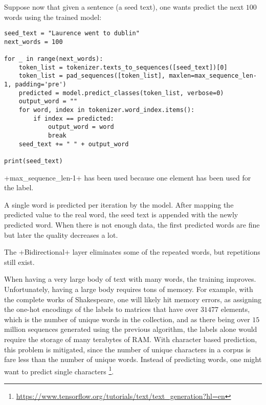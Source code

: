 Suppose now that given a sentence (a seed text), one wants predict the next $100$ words using the trained model:
\begin{lstlisting}
seed_text = "Laurence went to dublin"
next_words = 100
  
for _ in range(next_words):
	token_list = tokenizer.texts_to_sequences([seed_text])[0]
	token_list = pad_sequences([token_list], maxlen=max_sequence_len-1, padding='pre')
	predicted = model.predict_classes(token_list, verbose=0)
	output_word = ""
	for word, index in tokenizer.word_index.items():
		if index == predicted:
			output_word = word
			break
	seed_text += " " + output_word

print(seed_text)
\end{lstlisting}
\cd+max_sequence_len-1+ has been used because one element has been used for the label.

A single word is predicted per iteration by the model. After mapping the predicted value to the real word, the seed text is appended with the newly predicted word. When there is not enough data, the first predicted words are fine but later the quality decreases a lot.

The \cd+Bidirectional+ layer eliminates some of the repeated words, but repetitions still exist.

When having a very large body of text with many words, the training improves. Unfortunately, having a large body requires tons of memory. For example, with the complete works of Shakespeare, one will likely hit memory errors, as assigning the one-hot encodings of the labels to matrices that have over $31477$ elements, which is the number of unique words in the collection, and as there being over $15$ million sequences generated using the previous algorithm, the labels alone would require the storage of many terabytes of RAM. With character based prediction, this problem is mitigated, since the number of unique characters in a corpus is fare less than the number of unique words. Instead of predicting words, one might want to predict single characters \footnote{\url{https://www.tensorflow.org/tutorials/text/text_generation?hl=en}}. 